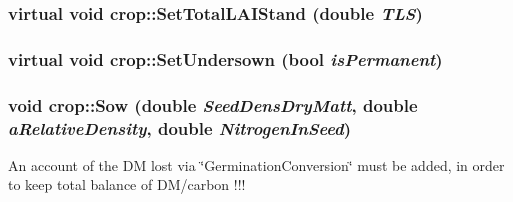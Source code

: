 \label{classcrop_a68b4dca8529ca2be2d18541a4249bba5}
\hypertarget{classcrop_ad827f06873022ef9681e99b83d3c9ea1}{
\subsubsection[{SetTotalLAIStand}]{\setlength{\rightskip}{0pt plus 5cm}virtual void crop::SetTotalLAIStand (double {\em TLS})}}
\label{classcrop_ad827f06873022ef9681e99b83d3c9ea1}
\hypertarget{classcrop_ae707acd0c0d6f2b03f3a8f97d1922508}{
\subsubsection[{SetUndersown}]{\setlength{\rightskip}{0pt plus 5cm}virtual void crop::SetUndersown (bool {\em isPermanent})}}
\label{classcrop_ae707acd0c0d6f2b03f3a8f97d1922508}
\hypertarget{classcrop_a2c5df235a96a1daa3ab122baf17518d4}{
\subsubsection[{Sow}]{\setlength{\rightskip}{0pt plus 5cm}void crop::Sow (double {\em SeedDensDryMatt}, \/  double {\em aRelativeDensity}, \/  double {\em NitrogenInSeed})}}
\label{classcrop_a2c5df235a96a1daa3ab122baf17518d4}
An account of the DM lost via \char`\"{}GerminationConversion\char`\"{} must be added, in order to keep total balance of DM/carbon !!! 


